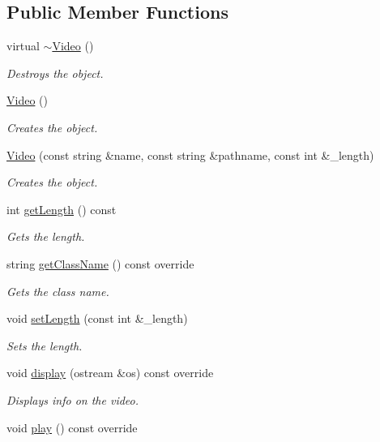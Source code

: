 \subsection*{Public Member Functions}
\begin{DoxyCompactItemize}
\item 
virtual \hyperlink{classVideo_a9a4f47fd7672b90c86d4c10176f89bb3}{$\sim$\+Video} ()
\begin{DoxyCompactList}\small\item\em Destroys the object. \end{DoxyCompactList}\item 
\hypertarget{classVideo_ac973e3d02151bb2bf7b75deda0c2ca5a}{}\hyperlink{classVideo_ac973e3d02151bb2bf7b75deda0c2ca5a}{Video} ()\label{classVideo_ac973e3d02151bb2bf7b75deda0c2ca5a}

\begin{DoxyCompactList}\small\item\em Creates the object. \end{DoxyCompactList}\item 
\hyperlink{classVideo_a0e70b25d96356f5ea3413f8f56cef897}{Video} (const string \&name, const string \&pathname, const int \&\+\_\+length)
\begin{DoxyCompactList}\small\item\em Creates the object. \end{DoxyCompactList}\item 
int \hyperlink{classVideo_afb9ed2097e0367a3c417321115ab965b}{get\+Length} () const 
\begin{DoxyCompactList}\small\item\em Gets the length. \end{DoxyCompactList}\item 
string \hyperlink{classVideo_a675d26365c71c29bc4b4b50ec2b36bc6}{get\+Class\+Name} () const override
\begin{DoxyCompactList}\small\item\em Gets the class name. \end{DoxyCompactList}\item 
void \hyperlink{classVideo_a90609ca4de9b4465e5facc27cc4b08e2}{set\+Length} (const int \&\+\_\+length)
\begin{DoxyCompactList}\small\item\em Sets the length. \end{DoxyCompactList}\item 
void \hyperlink{classVideo_a8acaac2f61e1989cf3a7dcafd14d8daf}{display} (ostream \&os) const override
\begin{DoxyCompactList}\small\item\em Displays info on the video. \end{DoxyCompactList}\item 
\hypertarget{classVideo_a61a4f3672781ab2db2d79dbbb2b1c228}{}void \hyperlink{classVideo_a61a4f3672781ab2db2d79dbbb2b1c228}{play} () const override\label{classVideo_a61a4f3672781ab2db2d79dbbb2b1c228}


\end{DoxyCompactItemize}
